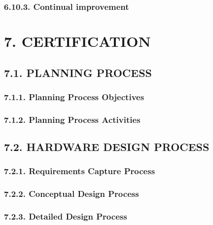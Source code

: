 \documentclass[
]{article}
\begin{document}
\hypertarget{continual-improvement}{%
\subsubsection{6.10.3. Continual
improvement}\label{continual-improvement}}

\hypertarget{certification}{%
\section{7. CERTIFICATION}\label{certification}}

\hypertarget{planning-process}{%
\subsection{7.1. PLANNING PROCESS}\label{planning-process}}

\hypertarget{planning-process-objectives}{%
\subsubsection{7.1.1. Planning Process
Objectives}\label{planning-process-objectives}}

\hypertarget{planning-process-activities}{%
\subsubsection{7.1.2. Planning Process
Activities}\label{planning-process-activities}}

\hypertarget{hardware-design-process}{%
\subsection{7.2. HARDWARE DESIGN
PROCESS}\label{hardware-design-process}}

\hypertarget{requirements-capture-process}{%
\subsubsection{7.2.1. Requirements Capture
Process}\label{requirements-capture-process}}

\hypertarget{conceptual-design-process}{%
\subsubsection{7.2.2. Conceptual Design
Process}\label{conceptual-design-process}}

\hypertarget{detailed-design-process}{%
\subsubsection{7.2.3. Detailed Design
Process}\label{detailed-design-process}}
\end{document}

